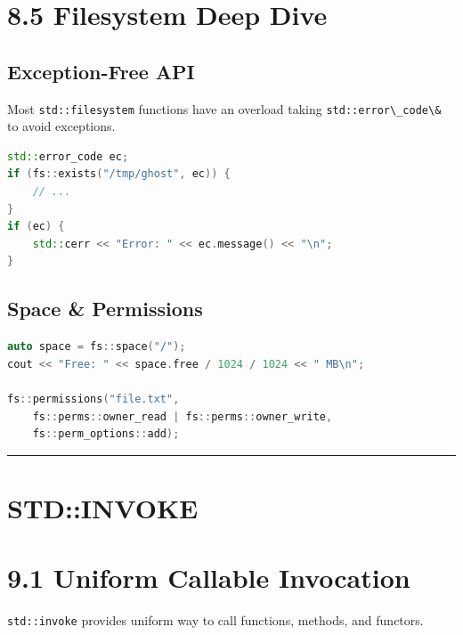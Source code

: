 \hypertarget{filesystem-deep-dive}{%
\section{8.5 Filesystem Deep Dive}\label{filesystem-deep-dive}}

\hypertarget{exception-free-api}{%
\subsection{Exception-Free API}\label{exception-free-api}}

Most \passthrough{\lstinline!std::filesystem!} functions have an
overload taking \passthrough{\lstinline!std::error\_code\&!} to avoid
exceptions.

\begin{lstlisting}[language={C++}]
std::error_code ec;
if (fs::exists("/tmp/ghost", ec)) {
    // ...
}
if (ec) {
    std::cerr << "Error: " << ec.message() << "\n";
}
\end{lstlisting}

\hypertarget{space-permissions}{%
\subsection{Space \& Permissions}\label{space-permissions}}

\begin{lstlisting}[language={C++}]
auto space = fs::space("/");
cout << "Free: " << space.free / 1024 / 1024 << " MB\n";

fs::permissions("file.txt", 
    fs::perms::owner_read | fs::perms::owner_write,
    fs::perm_options::add);
\end{lstlisting}

\begin{center}\rule{0.5\linewidth}{0.5pt}\end{center}

\hypertarget{stdinvoke}{%
\section{STD::INVOKE}\label{stdinvoke}}

\hypertarget{uniform-callable-invocation}{%
\section{9.1 Uniform Callable
Invocation}\label{uniform-callable-invocation}}

\passthrough{\lstinline!std::invoke!} provides uniform way to call
functions, methods, and functors.

